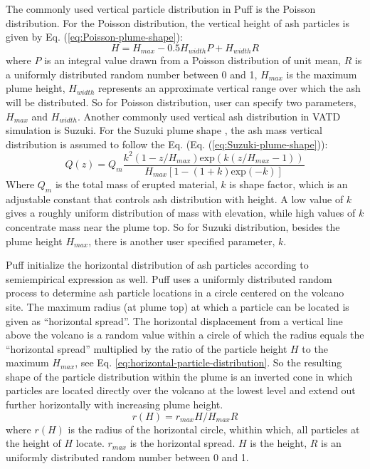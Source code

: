 \documentclass[utf8]{frontiersSCNS} %
\begin{document}
The commonly used vertical particle distribution in Puff is the Poisson distribution. For the Poisson distribution, the vertical height of ash particles is given by Eq. (\ref{eq:Poisson-plume-shape}):
\begin{equation}
H=H_{max} - 0.5 H_{width}P+H_{width}R
\label{eq:Poisson-plume-shape}
\end{equation}
where $P$ is an integral value drawn from a Poisson distribution of unit mean, $R$ is a uniformly distributed random number between 0 and 1, $H_{max}$ is the maximum plume height, $H_{width}$ represents an approximate vertical range over which the ash will be distributed. So for Poisson distribution, user can specify two parameters, $H_{max}$ and $H_{width}$.
Another commonly used vertical ash distribution in VATD simulation is Suzuki. For the Suzuki plume shape \citep{suzuki1983theoretical}, the ash mass vertical distribution is assumed to follow the Eq. (Eq. (\ref{eq:Suzuki-plume-shape})):
\begin{equation}
Q(z)=Q_m \frac{k^2(1-z/H_{max})\mbox{exp}\left(k(z/H_{max} -1 )\right)}{H_{max}\left[1-(1+k) \mbox{exp}(-k)\right]}
\label{eq:Suzuki-plume-shape}
\end{equation}
Where $Q_m$ is the total mass of erupted material, $k$ is shape factor, which is an adjustable constant that controls ash distribution with height. A low value of $k$ gives a roughly uniform distribution of mass with elevation, while high values of $k$ concentrate mass near the plume top.
So for Suzuki distribution, besides the plume height $H_{max}$, there is another user specified parameter, $k$.

Puff initialize the horizontal distribution of ash particles according to semiempirical expression as well. Puff uses a uniformly distributed random process to determine ash particle locations in a circle centered on the volcano site. The maximum radius (at plume top) at which a particle can be located is given as ``horizontal spread''. The horizontal displacement from a vertical line above the volcano is a random value within a circle of which the radius equals the ``horizontal spread'' multiplied by the ratio of the particle height $H$ to the maximum $H_{max}$, see Eq. \ref{eq:horizontal-particle-distribution}. So the resulting shape of the particle distribution within the plume is an inverted cone in which particles are located directly over the volcano at the lowest level and extend out further horizontally with increasing plume height.
\begin{equation}
r(H)= r_{max}  H / H_{max}  R
\label{eq:horizontal-particle-distribution} 
\end{equation}
where $r(H)$ is the radius of the horizontal circle, whithin which, all particles at the height of $H$ locate. $r_{max}$ is the horizontal spread. $H$ is the height, $R$ is an uniformly distributed random number between 0 and 1.
\end{document}
